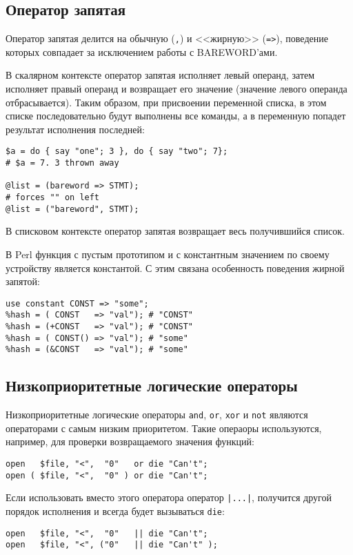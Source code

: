 \subsection{Оператор запятая}
Оператор запятая делится на обычную (\verb|,|) и <<жирную>> (\verb|=>|), поведение которых совпадает за исключением работы с BAREWORD'ами.

В скалярном контексте оператор запятая исполняет левый операнд, затем исполняет правый операнд и возвращает его значение (значение левого операнда отбрасывается). Таким образом, при присвоении переменной списка, в этом списке последовательно будут выполнены все команды, а в переменную попадет результат исполнения последней:
\begin{verbatim}
$a = do { say "one"; 3 }, do { say "two"; 7};
# $a = 7. 3 thrown away

@list = (bareword => STMT);
# forces "" on left
@list = ("bareword", STMT);
\end{verbatim}
В списковом контексте оператор запятая возвращает весь получившийся список.

В Perl функция с пустым прототипом и с константным значением по своему устройству является константой. С этим связана особенность поведения жирной запятой:
\begin{verbatim}
use constant CONST => "some";
%hash = ( CONST   => "val"); # "CONST"
%hash = (+CONST   => "val"); # "CONST"
%hash = ( CONST() => "val"); # "some"
%hash = (&CONST   => "val"); # "some"
\end{verbatim}

\subsection{Низкоприоритетные логические операторы}
Низкоприоритетные логические операторы \verb|and|, \verb|or|, \verb|xor| и \verb|not| являются операторами с самым низким приоритетом. Такие операоры используются, например, для проверки возвращаемого значения функций: %
\begin{verbatim}
open   $file, "<",  "0"   or die "Can't";
open ( $file, "<",  "0" ) or die "Can't";
\end{verbatim}
Если использовать вместо этого оператора оператор \verb+|...|+, получится другой порядок исполнения и всегда будет вызываться \verb|die|:
\begin{verbatim}
open   $file, "<",  "0"   || die "Can't";
open   $file, "<", ("0"   || die "Can't" );
\end{verbatim}

